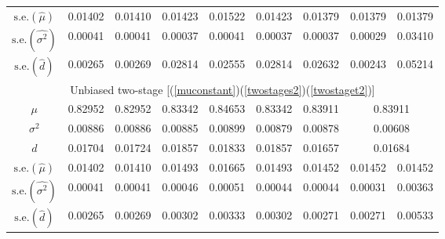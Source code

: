 \documentclass[11pt,a5paper,twoside]{book}
\begin{document}
\begin{table}[!t]
\begin{center}
{\begin{tabular}{ccccccccc}
\hline
$\mbox{s.e.}(\widehat{\mu})$ & 0.01402 & 0.01410 & 0.01423 & 0.01522 & 0.01423 & 0.01379 & 0.01379 & 0.01379 \\
$\mbox{s.e.}(\widehat{\sigma^2})$ & 0.00041 & 0.00041 & 0.00037 & 0.00041 & 0.00037 & 0.00037 & 0.00029 & 0.03410 \\
  $\mbox{s.e.}(\widehat{d})$ & 0.00265 & 0.00269 & 0.02814 & 0.02555 & 0.02814 & 0.02632 & 0.00243 & 0.05214 \\


\hline\hline
\multicolumn{9}{c}{{Unbiased two-stage [(\ref{muconstant})(\ref{twostages2})(\ref{twostaget2})]}}\\
\hline
$\mu$  & 0.82952 & 0.82952 & 0.83342 & 0.84653 & 0.83342 & 0.83911 & \multicolumn{2}{c}{0.83911}  \\
$\sigma^2$ & 0.00886 & 0.00886 & 0.00885 & 0.00899 & 0.00879 & 0.00878 & \multicolumn{2}{c}{0.00608}  \\
$d$ & 0.01704 & 0.01724 & 0.01857 & 0.01833 & 0.01857 & 0.01657 & \multicolumn{2}{c}{0.01684}  \\

\hline
$\mbox{s.e.}(\widehat{\mu})$ & 0.01402 & 0.01410 & 0.01493 & 0.01665 & 0.01493 & 0.01452 & 0.01452 & 0.01452 \\
$\mbox{s.e.}(\widehat{\sigma^2})$ & 0.00041 & 0.00041 & 0.00046 & 0.00051 & 0.00044 & 0.00044 & 0.00031 & 0.00363 \\
  $\mbox{s.e.}(\widehat{d})$ & 0.00265 & 0.00269 & 0.00302 & 0.00333 & 0.00302 & 0.00271 & 0.00271 & 0.00533 \\


\hline\hline
\end{tabular}}
\end{center}
\end{table}



\end{document}
